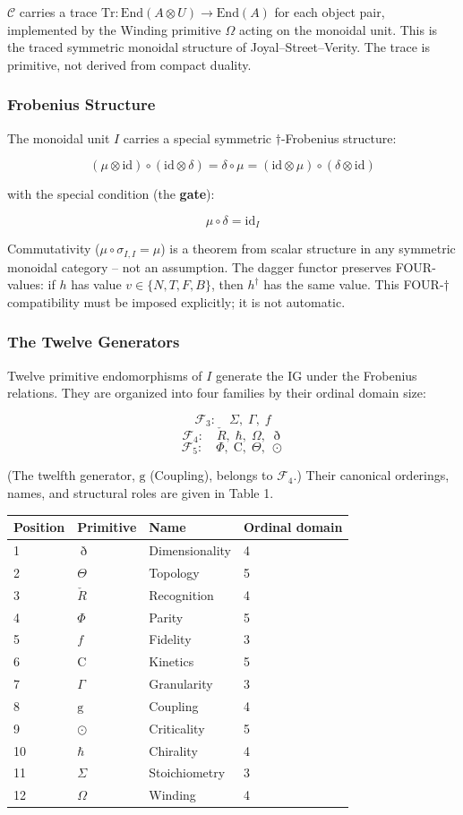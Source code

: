 \documentclass[12pt,a4paper]{article}
\begin{document}
\(\mathcal{C}\) carries a trace
\(\mathrm{Tr}: \mathrm{End}(A \otimes U) \to \mathrm{End}(A)\) for each
object pair, implemented by the Winding primitive \(\Omega\) acting on
the monoidal unit. This is the traced symmetric monoidal structure of
Joyal--Street--Verity. The trace is primitive, not derived from compact
duality.

\hypertarget{frobenius-structure}{%
\subsubsection{Frobenius Structure}\label{frobenius-structure}}

The monoidal unit \(I\) carries a special symmetric
\(\dagger\)-Frobenius structure:

\[(\mu \otimes \mathrm{id}) \circ (\mathrm{id} \otimes \delta) = \delta \circ \mu = (\mathrm{id} \otimes \mu) \circ (\delta \otimes \mathrm{id})\]

with the special condition (the \textbf{gate}):

\[\mu \circ \delta = \mathrm{id}_I\]

Commutativity (\(\mu \circ \sigma_{I,I} = \mu\)) is a theorem from
scalar structure in any symmetric monoidal category -- not an
assumption. The dagger functor preserves FOUR-values: if \(h\) has value
\(v \in \{N, T, F, B\}\), then \(h^\dagger\) has the same value. This
FOUR-\(\dagger\) compatibility must be imposed explicitly; it is not
automatic.

\hypertarget{the-twelve-generators}{%
\subsubsection{The Twelve Generators}\label{the-twelve-generators}}

Twelve primitive endomorphisms of \(I\) generate the IG under the
Frobenius relations. They are organized into four families by their
ordinal domain size:

\[\mathcal{F}_3: \quad \Sigma, \; \Gamma, \; \mathit{f}\]
\[\mathcal{F}_4: \quad \check{R}, \; \hbar, \; \Omega, \; \eth\]
\[\mathcal{F}_5: \quad \Phi, \; \mathrm{C}, \; \Theta, \; \odot\]

(The twelfth generator, \(\mathrm{g}\) (Coupling), belongs to
\(\mathcal{F}_4\).) Their canonical orderings, names, and structural
roles are given in Table 1.

\begin{longtable}[]{@{}llll@{}}
\toprule
Position & Primitive & Name & Ordinal domain\tabularnewline
\midrule
\endhead
1 & \(\eth\) & Dimensionality & 4\tabularnewline
2 & \(\Theta\) & Topology & 5\tabularnewline
3 & \(\check{R}\) & Recognition & 4\tabularnewline
4 & \(\Phi\) & Parity & 5\tabularnewline
5 & \(f\) & Fidelity & 3\tabularnewline
6 & \(\mathrm{C}\) & Kinetics & 5\tabularnewline
7 & \(\Gamma\) & Granularity & 3\tabularnewline
8 & \(\mathrm{g}\) & Coupling & 4\tabularnewline
9 & \(\odot\) & Criticality & 5\tabularnewline
10 & \(\hbar\) & Chirality & 4\tabularnewline
11 & \(\Sigma\) & Stoichiometry & 3\tabularnewline
12 & \(\Omega\) & Winding & 4\tabularnewline
\bottomrule
\end{longtable}
\end{document}
